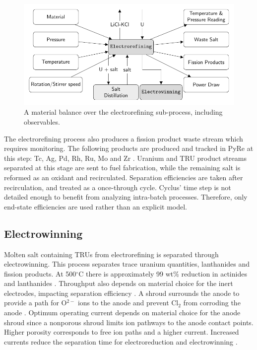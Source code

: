 \documentclass{anstrans}
\begin{document}
\begin{figure}[ht]
	\centering
	\includegraphics[width=1\linewidth]{refining}
	\caption{A material balance over the electrorefining sub-process, including observables.}
	\label{fig:refining}
\end{figure}
 
The electrorefining process also produces a fission product waste stream which requires monitoring. 
The following products are produced and tracked in \gls{PyRe} at this step: Tc, Ag, Pd, Rh, Ru, Mo and Zr \cite{flowsheet_1998}. 
Uranium and \gls{TRU} product streams separated at this stage are sent to fuel fabrication, while the remaining salt is reformed as an oxidant and recirculated.
Separation efficiencies are taken after recirculation, and treated as a once-through cycle. Cyclus' time step
is not detailed enough to benefit from analyzing intra-batch processes. Therefore, only end-state efficiencies are used rather than an explicit model.

\subsection{Electrowinning}

Molten salt containing \glspl{TRU} from electrorefining is separated through electrowinning. This process separates trace uranium quantities, lanthanides and fission products. 
At 500$^{\circ}$C there is approximately 99 wt\% reduction in actinides and lanthanides \cite{flowsheet_1998}. 
Throughput also depends on material choice for the inert electrodes, impacting separation 
efficiency \cite{koyama_development_2012}. A shroud surrounds the anode to provide a path for O$^{2-}$ ions to the anode and 
prevent Cl$_2$ from corroding the anode \cite{kim_development_2013,choi_electrochemical_2015}. Optimum operating current 
depends on material choice for the anode shroud since a nonporous shroud limits ion pathways to the anode contact points.
Higher porosity corresponds to free ion paths and a higher current. Increased currents reduce the separation time for electroreduction and electrowinning \cite{choi_electrochemical_2015}.
\end{document}
